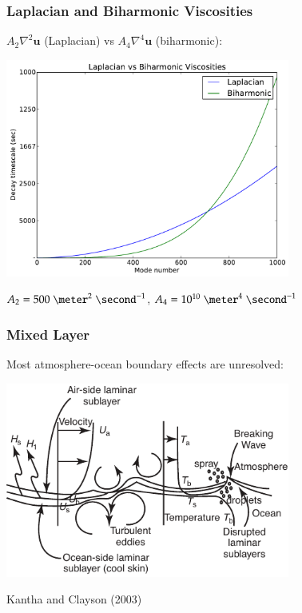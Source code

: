 \documentclass{beamer}
\begin{document}
\begin{frame}
    \frametitle{Laplacian and Biharmonic Viscosities}
    
    $A_2 \nabla^2 \mathbf{u}$ (Laplacian) vs $A_4 \nabla^4 \mathbf{u}$
    (biharmonic):
    \begin{center}
        \includegraphics[width=0.7\textwidth]{lateral_friction.pdf}
    \end{center}
    $A_2 = 500 \; \meter^2 \; \second^{-1}$,
    $A_4 = 10^{10} \; \meter^4 \; \second^{-1}$
\end{frame}

\begin{frame}
    \frametitle{Mixed Layer}
    
    Most atmosphere-ocean boundary effects are unresolved:
    \begin{center}
        \includegraphics[width=0.7\textwidth]{mixed_layer.pdf}
    \end{center}
    {\tiny Kantha and Clayson (2003)}
\end{frame}
\end{document}
